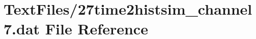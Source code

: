 \hypertarget{27time2histsim__channel7_8dat}{}\section{Text\+Files/27time2histsim\+\_\+channel7.dat File Reference}
\label{27time2histsim__channel7_8dat}
